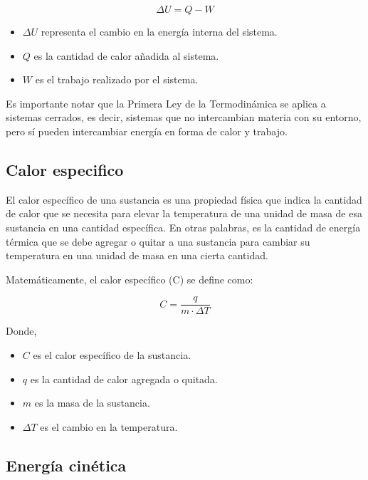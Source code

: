 \documentclass[letterpaper, 12pt]{article}
\begin{document}
\begin{equation*}
      \Delta U = Q - W
\end{equation*}

\begin{itemize}[label=$\triangleright$]
      \item $\Delta U$ representa el cambio en la energía interna del sistema.
      \item $Q$ es la cantidad de calor añadida al sistema.
      \item $W$ es el trabajo realizado por el sistema.
\end{itemize}

Es importante notar que la Primera Ley de la Termodinámica
se aplica a sistemas cerrados, es decir, sistemas que no
intercambian materia con su entorno, pero sí pueden
intercambiar energía en forma de calor y trabajo.

\subsection{Calor especifico}

El calor específico de una sustancia es una propiedad
física que indica la cantidad de calor que se necesita para
elevar la temperatura de una unidad de masa de esa
sustancia en una cantidad específica. En otras palabras, es
la cantidad de energía térmica que se debe agregar o quitar
a una sustancia para cambiar su temperatura en una unidad
de masa en una cierta cantidad.

Matemáticamente, el calor específico (C) se define como:

\begin{equation*}
      C = \frac{q}{m \cdot \Delta T}
\end{equation*}

Donde,

\begin{itemize}
      \item $C$ es el calor específico de la sustancia.
      \item $q$ es la cantidad de calor agregada o quitada.
      \item $m$ es la masa de la sustancia.
      \item $\Delta T$ es el cambio en la temperatura.
\end{itemize}

\subsection{Energía cinética}
\end{document}
